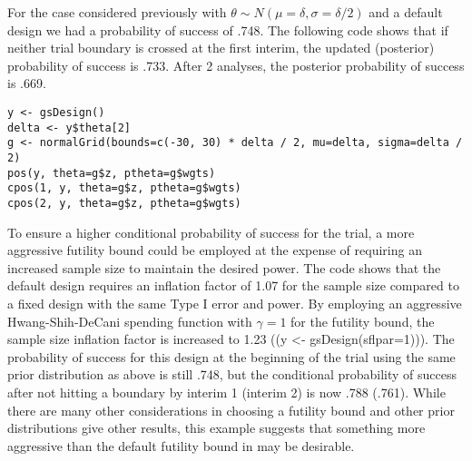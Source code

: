 For the case considered previously with $\theta\sim N(\mu=\delta, \sigma=\delta/2)$ and a default design we had a probability of success of .748. 
The following code shows that if neither trial boundary is crossed at the first interim, the updated (posterior) probability of success is .733. 
After 2 analyses, the posterior probability of success is .669.
\begin{verbatim}
y <- gsDesign()
delta <- y$theta[2]
g <- normalGrid(bounds=c(-30, 30) * delta / 2, mu=delta, sigma=delta / 2)
pos(y, theta=g$z, ptheta=g$wgts)
cpos(1, y, theta=g$z, ptheta=g$wgts)
cpos(2, y, theta=g$z, ptheta=g$wgts)
\end{verbatim} 
To ensure a higher conditional probability of success for the trial, a more aggressive futility bound could be employed at the expense of requiring an increased sample size to maintain the desired power. 
The code  shows that the default design requires an inflation factor of 1.07 for the sample size compared to a fixed design with the same Type I error and power.
By employing an aggressive Hwang-Shih-DeCani spending function with $\gamma = 1$ for the futility bound, the sample size inflation factor is increased to 1.23 (\code(y <- gsDesign(sflpar=1))).
The probability of success for this design at the beginning of the trial using the same prior distribution as above is still .748, but the conditional probability of success after not hitting a boundary by interim 1 (interim 2) is now .788 (.761). 
While there are many other considerations in choosing a futility bound and other prior distributions give other results, this example suggests that something more aggressive than the default futility bound in  may be desirable. 
